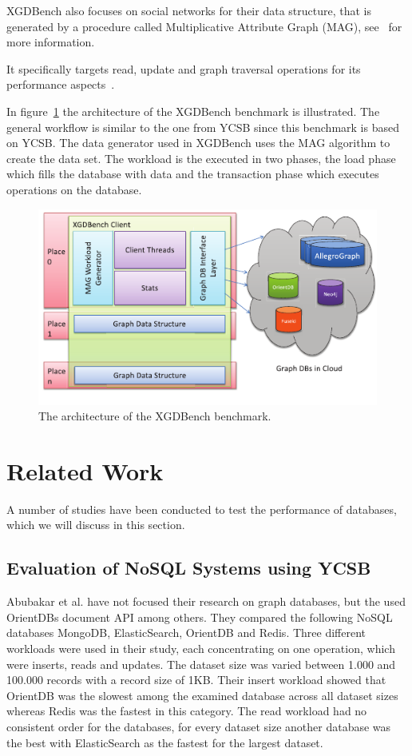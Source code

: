 XGDBench also focuses on social networks for their data structure,
that is generated by a procedure called Multiplicative Attribute Graph (MAG),
see~\cite{Kim2012} for more information.

It specifically targets read,
update and graph traversal operations for its performance aspects~\cite[366]{Dayarathna2012}.

In figure~\ref{fig:XGDBenchArchitecture} the architecture of the XGDBench benchmark is illustrated.
The general workflow is similar to the one from YCSB since this benchmark is based on YCSB.
The data generator used in XGDBench uses the MAG algorithm to create the data set.
The workload is the executed in two phases,
the load phase which fills the database with data and the transaction phase which executes operations on the database.

\begin{figure}[h!]
  \centering
  \includegraphics[width=.75\textwidth]{images/benchmarks/XGDBenchArchitecture}
  \caption{The architecture of the XGDBench benchmark\cite[367]{Dayarathna2012}.}
  \label{fig:XGDBenchArchitecture}
\end{figure}

\section{Related Work}
A number of studies have been conducted to test the performance of databases,
which we will discuss in this section.

\subsection{Evaluation of NoSQL Systems using YCSB}
Abubakar et al. have not focused their research on graph databases,
but the used OrientDBs document API among others.
They compared the following NoSQL databases MongoDB, ElasticSearch, OrientDB and Redis.
Three different workloads were used in their study,
each concentrating on one operation,
which were inserts, reads and updates.
The dataset size was varied between 1.000 and 100.000 records with a record size of 1KB.
Their insert workload showed that OrientDB was the slowest among the examined database across all dataset sizes whereas Redis was the fastest in this category.
The read workload had no consistent order for the databases,
for every dataset size another database was the best with ElasticSearch as the fastest for the largest dataset.\cite{Abubakar2014}

